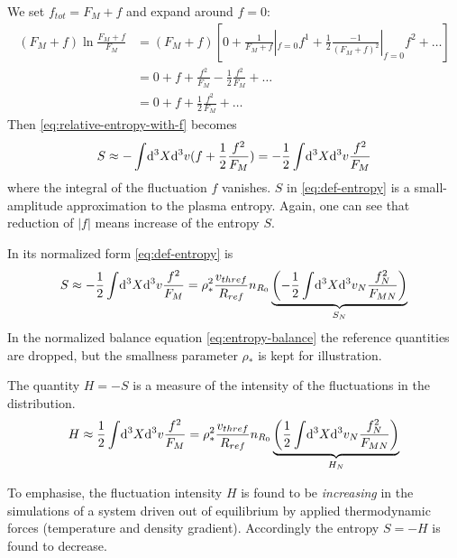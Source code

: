 We set $f_{tot} = F_M + f$ and expand around $f=0$: 
\begin{align}
  (F_M + f)\ln\frac{F_M + f}{F_M} &= (F_M + f)\left[0 + \frac{1}{F_M + f}|_{f=0}f^1 + \frac{1}{2}\frac{-1}{(F_M + f)^2}|_{f=0}f^2 + \ldots\right] \nonumber\\
  &= 0 + f + \frac{f^2}{F_M} - \frac{1}{2}\frac{f^2}{F_M} + \ldots \nonumber\\
  &= 0 + f + \frac{1}{2}\frac{f^2}{F_M} + \ldots
\end{align}
Then \ref{eq:relative-entropy-with-f} becomes
\begin{align}
  \label{eq:def-entropy}
  S \approx -\int\!\mathrm{d}^3X\mathrm{d}^3v (f + \frac{1}{2}\frac{f^2}{F_M}) = -\frac{1}{2}\int\!\mathrm{d}^3X\mathrm{d}^3v\frac{f^2}{F_M}
\end{align}
where the integral of the fluctuation $f$ vanishes. 
$S$ in \ref{eq:def-entropy} is a small-amplitude approximation to the plasma entropy.  %
 Again, one can see that reduction of $|f|$ means increase of the entropy $S$.

In its normalized form  \ref{eq:def-entropy} is 
\begin{equation}
  \label{eq:entropy}
  S \approx -\frac{1}{2}\int\!\mathrm{d}^3X\mathrm{d}^3v\frac{f^2}{F_M} = \rho_*^2 \frac{v_{thref}}{R_{ref}}n_{R_0}\underbrace{\left(-\frac{1}{2}\int\!\mathrm{d}^3X\mathrm{d}^3v_N\frac{f_N^2}{F_{MN}}\right)}_{S_N}
\end{equation}
In the normalized balance equation \ref{eq:entropy-balance} the reference quantities are dropped, but the smallness parameter $\rho_*$ is kept for illustration.

The quantity $H = -S$ is a measure of the intensity of the fluctuations in the distribution.%
\begin{equation}
  \label{eq:intensity}
  H \approx \frac{1}{2}\int\!\mathrm{d}^3X\mathrm{d}^3v\frac{f^2}{F_M} = \rho_*^2 \frac{v_{thref}}{R_{ref}}n_{R_0}\underbrace{\left(\frac{1}{2}\int\!\mathrm{d}^3X\mathrm{d}^3v_N\frac{f_N^2}{F_{MN}}\right)}_{H_N}
\end{equation}

To emphasise, the fluctuation intensity $H$ is found to be \emph{increasing} in the simulations of a system driven out of equilibrium by applied thermodynamic forces (temperature and density gradient). Accordingly the entropy $S=-H$ is found to decrease.

